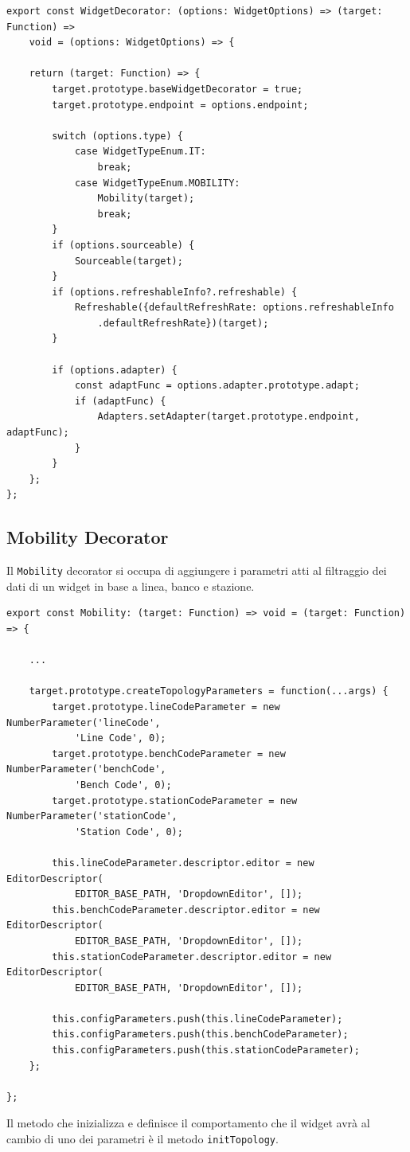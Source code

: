 \begin{lstlisting}[caption={Decorator factory WidgetDecorator}, style=javaScriptCode]
export const WidgetDecorator: (options: WidgetOptions) => (target: Function) => 
    void = (options: WidgetOptions) => {

    return (target: Function) => {
        target.prototype.baseWidgetDecorator = true;
        target.prototype.endpoint = options.endpoint;

        switch (options.type) {
            case WidgetTypeEnum.IT:
                break;
            case WidgetTypeEnum.MOBILITY:
                Mobility(target);
                break;
        }
        if (options.sourceable) {
            Sourceable(target);
        }
        if (options.refreshableInfo?.refreshable) {
            Refreshable({defaultRefreshRate: options.refreshableInfo
                .defaultRefreshRate})(target);
        }

        if (options.adapter) {
            const adaptFunc = options.adapter.prototype.adapt;
            if (adaptFunc) {
                Adapters.setAdapter(target.prototype.endpoint, adaptFunc);
            }
        }
    };
};
\end{lstlisting}
\subsection{Mobility Decorator}
Il \verb|Mobility| decorator si occupa di aggiungere i parametri atti al filtraggio dei dati di un widget in base a linea, banco e stazione.

\begin{lstlisting}[caption={Metodo di creazione dei parametri all'interno del decorator Mobility}, style=javaScriptCode]
export const Mobility: (target: Function) => void = (target: Function) => {

    ...

    target.prototype.createTopologyParameters = function(...args) {
        target.prototype.lineCodeParameter = new NumberParameter('lineCode', 
            'Line Code', 0);
        target.prototype.benchCodeParameter = new NumberParameter('benchCode', 
            'Bench Code', 0);
        target.prototype.stationCodeParameter = new NumberParameter('stationCode', 
            'Station Code', 0);

        this.lineCodeParameter.descriptor.editor = new EditorDescriptor(
            EDITOR_BASE_PATH, 'DropdownEditor', []);
        this.benchCodeParameter.descriptor.editor = new EditorDescriptor(
            EDITOR_BASE_PATH, 'DropdownEditor', []);
        this.stationCodeParameter.descriptor.editor = new EditorDescriptor(
            EDITOR_BASE_PATH, 'DropdownEditor', []);

        this.configParameters.push(this.lineCodeParameter);
        this.configParameters.push(this.benchCodeParameter);
        this.configParameters.push(this.stationCodeParameter);
    };

};
\end{lstlisting}
Il metodo che inizializza e definisce il comportamento che il widget avrà al cambio di uno dei parametri è il metodo \verb|initTopology|.

